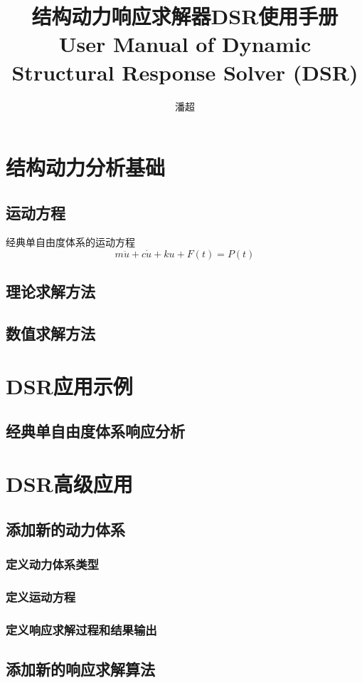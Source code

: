 \documentclass[UTF8]{ctexrep}
\begin{document}
\title{结构动力响应求解器DSR使用手册\\ [2ex] User Manual of Dynamic Structural Response Solver (DSR)}
\author{潘超}
\date{}
\maketitle

\tableofcontents
\setcounter{page}{1}

\chapter{结构动力分析基础}
\setcounter{page}{1}
\section{运动方程}
经典单自由度体系的运动方程
\begin{equation}\label{eq1}
m \ddot{u} + c \dot{u} + ku + F (t) = P (t)
\end{equation}


\section{理论求解方法}
\section{数值求解方法}
\chapter{DSR应用示例}
\section{经典单自由度体系响应分析}
\chapter{DSR高级应用}
\section{添加新的动力体系}
\subsection{定义动力体系类型}
\subsection{定义运动方程}
\subsection{定义响应求解过程和结果输出}
\section{添加新的响应求解算法}
\end{document}
